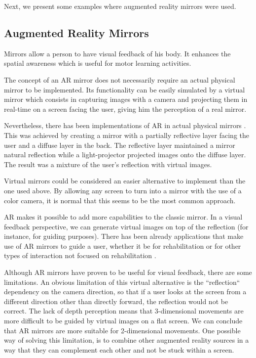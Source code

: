 Next, we present some examples where augmented reality mirrors were used.



\subsection{Augmented Reality Mirrors}
\label{RW-mirrors}
Mirrors allow a person to have visual feedback of his body. It enhances the spatial awareness which is useful for motor learning activities.

The concept of an \ac{AR} mirror does not necessarily require an 
actual physical mirror to be implemented. 
Its functionality can be easily simulated by a virtual mirror 
which consists in capturing images with a camera and projecting 
them in real-time on a screen facing the user, 
giving him the perception of a real mirror. 

Nevertheless, there has been implementations of \ac{AR} in actual physical mirrors \cite{Anderson}. 
This was achieved by creating a mirror with a partially reflective layer facing the user and a diffuse layer in the back. 
The reflective layer maintained a mirror natural reflection while a light-projector projected images onto the diffuse layer.
The result was a mixture of the user's reflection with virtual images.

Virtual mirrors could be considered an easier alternative to implement than the one used above. 
By allowing any screen to turn into a mirror with the use of a color camera, 
it is normal that this seems to be the most common approach.

%

\ac{AR} makes it possible to add more capabilities to the classic mirror. In a visual feedback perspective, we can generate virtual images on top of the reflection (for instance, for guiding purposes). There has been already applications that make use of \ac{AR} mirrors to guide a user, whether it be for rehabilitation \cite{Tang2014a, Velloso2013, Klein2013} or for other types of interaction not focused on rehabilitation \cite{Alhamid2012a, blum2012}.

Although \ac{AR} mirrors have proven to be useful for visual feedback, there are some limitations. 
An obvious limitation of this virtual alternative is the ``reflection`` dependency on the camera direction, 
so that if a user looks at the screen from a different direction
other than directly forward, the reflection would not be correct.
The lack of depth perception means that 3-dimensional movements are more difficult to be guided by virtual images on a flat screen. We can conclude that \ac{AR} mirrors are more suitable for 2-dimensional movements. One possible way of solving this limitation, is to combine other augmented reality sources in a way that they can complement each other and not be stuck within a screen.


